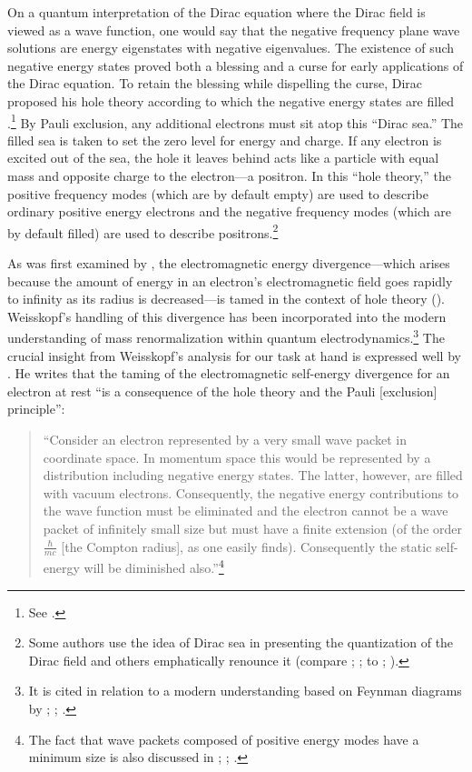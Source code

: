 \documentclass[onecolumn,secnumarabic,amsmath,amssymb,balancelastpage,nofootinbib]{article}
\begin{document}
On a quantum interpretation of the Dirac equation where the Dirac field is viewed as a wave function, one would say that the negative frequency plane wave solutions are energy eigenstates with negative eigenvalues.  The existence of such negative energy states proved both a blessing and a curse for early applications of the Dirac equation.  To retain the blessing while dispelling the curse, Dirac proposed his hole theory according to which the negative energy states are filled \citep{dirac1930theory}.\footnote{See \citet{saunders1991, pashby2012}.}  By Pauli exclusion, any additional electrons must sit atop this ``Dirac sea.''  The filled sea is taken to set the zero level for energy and charge.  If any electron is excited out of the sea, the hole it leaves behind acts like a particle with equal mass and opposite charge to the electron---a positron.  In this ``hole theory,'' the positive frequency modes (which are by default empty) are used to describe ordinary positive energy electrons and the negative frequency modes (which are by default filled) are used to describe positrons.\footnote{Some authors use the idea of Dirac sea in presenting the quantization of the Dirac field and others emphatically renounce it (compare \citealp[section 8a]{schweberQFT}; \citealp[section 13.4]{bjorkendrellfields}; \citealp{hatfield} to \citealp[chapter 2]{duncan}; \citealp[pg.\ 142]{schwartz}).}
 
As was first examined by \citet{weisskopf1934a, weisskopf1934b, weisskopf1939}, the electromagnetic energy divergence---which arises because the amount of energy in an electron's electromagnetic field goes rapidly to infinity as its radius is decreased---is tamed in the context of hole theory (\citealp[section 2.5.3]{schweber1994}).  Weisskopf's handling of this divergence has been incorporated into the modern understanding of mass renormalization within quantum electrodynamics.\footnote{It is cited in relation to a modern understanding based on Feynman diagrams by \citet[pg.\ 513]{schweberQFT}; \citet[pg.\ 165]{bjorkendrell}; \citet[section II.D.2]{weisskopf1986}.}  The crucial insight from Weisskopf's analysis for our task at hand is expressed well by \citet[pg.\ 299]{heitler}.  He writes that the taming of the electromagnetic self-energy divergence for an electron at rest ``is a consequence of the hole theory and the Pauli [exclusion] principle'':
\begin{quote}
``Consider an electron represented by a very small wave packet in coordinate space.  In momentum space this would be represented by a distribution including negative energy states.  The latter, however, are filled with vacuum electrons.  Consequently, the negative energy contributions to the wave function must be eliminated and the electron cannot be a wave packet of infinitely small size but must have a finite extension (of the order $\frac{\hbar}{mc}$ [the Compton radius], as one easily finds).  Consequently the static self-energy will be diminished also.''\footnote{The fact that wave packets composed of positive energy modes have a minimum size is also discussed in \citet{newton1949}; \citet[pg.\ 39]{bjorkendrell}; \citet{chuu2007}.}
\end{quote}
\end{document}
